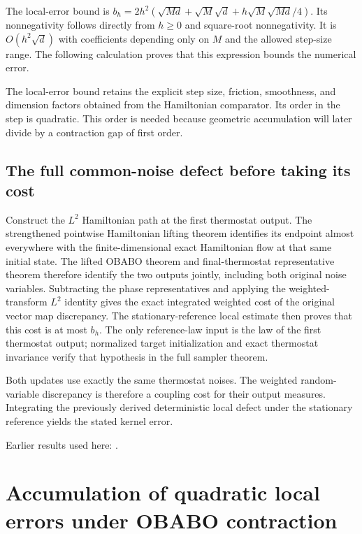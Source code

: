 \documentclass[11pt,a4paper]{report}
\begin{document}
The local-error bound is \(b_h=2h^2(\sqrt{Md}+\sqrt M\sqrt d+h\sqrt M\sqrt{Md}/4)\). Its nonnegativity follows directly from \(h\ge0\) and square-root nonnegativity. It is \(O(h^{2}\sqrt d)\) with coefficients depending only on \(M\) and the allowed step-size range. The following calculation proves that this expression bounds the numerical error.



The local-error bound retains the explicit step size, friction, smoothness, and dimension factors obtained from the Hamiltonian comparator. Its order in the step is quadratic. This order is needed because geometric accumulation will later divide by a contraction gap of first order.

\subsection{\texorpdfstring{The full common-noise defect before taking its cost}{The full common-noise defect before taking its cost}}
\label{report-step-KineticLangevin-OBABOLocalCost-lean-2}


Construct the \(L^{2}\) Hamiltonian path at the first thermostat output. The strengthened pointwise Hamiltonian lifting theorem identifies its endpoint almost everywhere with the finite-dimensional exact Hamiltonian flow at that same initial state. The lifted OBABO theorem and final-thermostat representative theorem therefore identify the two outputs jointly, including both original noise variables. Subtracting the phase representatives and applying the weighted-transform \(L^{2}\) identity gives the exact integrated weighted cost of the original vector map discrepancy. The stationary-reference local estimate then proves that this cost is at most \(b_h\). The only reference-law input is the law of the first thermostat output; normalized target initialization and exact thermostat invariance verify that hypothesis in the full sampler theorem.



Both updates use exactly the same thermostat noises. The weighted random-variable discrepancy is therefore a coupling cost for their output measures. Integrating the previously derived deterministic local defect under the stationary reference yields the stated kernel error.



Earlier results used here: \cite[Section~3.13.2]{LangevinLean2026ULASC}.
\section{\texorpdfstring{Accumulation of quadratic local errors under OBABO contraction}{Accumulation of quadratic local errors under OBABO contraction}}
\label{proof-module-KineticLangevin-OBABOBiasScalar-lean}
\end{document}

